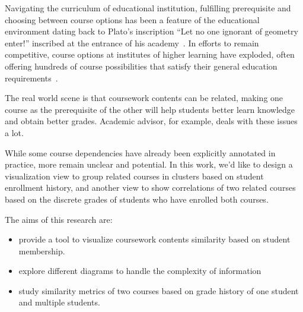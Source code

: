 
Navigating the curriculum of educational institution, fulfilling prerequisite and choosing between course options has been a feature of the educational environment dating back to Plato’s inscription ``Let no one ignorant of geometry enter!'' inscribed at the entrance of his academy~\cite{anglin1994mathematics}. In efforts to remain competitive, course options at institutes of higher learning have exploded, often offering hundreds of course possibilities that satisfy their general education requirements~\cite{schwartz2009paradox}.

The real world scene is that coursework contents can be related, making one course as the prerequisite of the other will help students better learn knowledge and obtain better grades. Academic advisor, for example, deals with these issues a lot.

While some course dependencies have already been explicitly annotated in practice, more remain unclear and potential. In this work, we’d like to design a visualization view to group related courses in clusters based on student enrollment history, and another view to show correlations of two related courses based on the discrete grades of students who have enrolled both courses.

The aims of this research are:
\begin{itemize}
  \item provide a tool to visualize coursework contents similarity based on student membership.
  \item explore different diagrams to handle the complexity of information
  \item study similarity metrics of two courses based on grade history of one student and multiple students.
\end{itemize}

